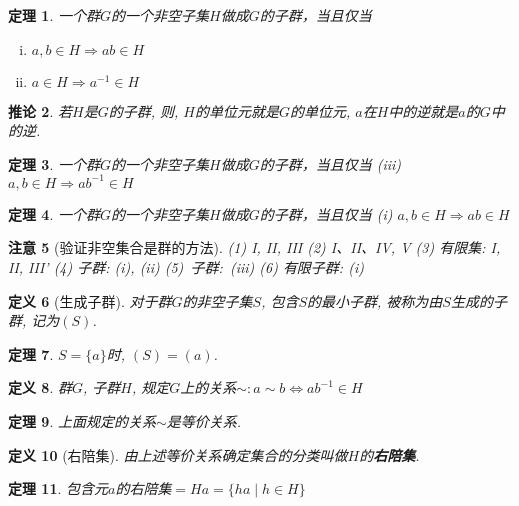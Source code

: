 \documentclass[UTF8]{ctexart}
\newtheorem{Definition}{定义}%
\newtheorem{Theorem}[Definition]{定理}
\newtheorem{Remark}[Definition]{注意}
\newtheorem{Corollary}[Definition]{推论}
\begin{document}
\begin{Theorem}
一个群$G$的一个非空子集$H$做成$G$的子群，当且仅当
\begin{enumerate}[(i)]
\item $a, b \in H \Rightarrow ab \in H$
\item $a \in H \Rightarrow a^{-1} \in H$
\end{enumerate}
\end{Theorem}

\begin{Corollary}
若$H$是$G$的子群, 则, $H$的单位元就是$G$的单位元, $a$在$H$中的逆就是$a$的$G$中的逆.
\end{Corollary}

\begin{Theorem}
一个群$G$的一个非空子集$H$做成$G$的子群，当且仅当 (iii) $a, b \in H \Rightarrow ab^{-1} \in H$
\end{Theorem}

\begin{Theorem}
一个群$G$的一个非空\;\;子集$H$做成$G$的子群，当且仅当 (i) $a, b \in H \Rightarrow ab \in H$
\end{Theorem}

\begin{Remark}[验证非空集合是群的方法]
(1) I, II, III (2) I、II、IV, V (3) 有限集: I, II, III'
(4) 子群: (i), (ii) \mbox{(5) 子群: (iii)} (6) 有限子群: (i)
\end{Remark}

\begin{Definition}[生成子群]
对于群$G$的非空子集$S$, 包含$S$的最小子群, 被称为由$S$生成的子群, 记为$(S)$.
\end{Definition}

\begin{Theorem}
$S = \{a\}$时, $(S) = (a)$.
\end{Theorem}

\begin{Definition}
群$G$, 子群$H$, 规定$G$上的关系$\sim: a \sim b \Leftrightarrow a b^{-1} \in H$
\end{Definition}

\begin{Theorem}
上面规定的关系$\sim$是等价关系.
\end{Theorem}

\begin{Definition}[右陪集]
由上述等价关系确定集合的分类叫做$H$的\textbf{右陪集}.
\end{Definition}

\begin{Theorem}
包含元$a$的右陪集$ = Ha =  \{ ha \mid h \in H \}$
\end{Theorem}
\end{document}
